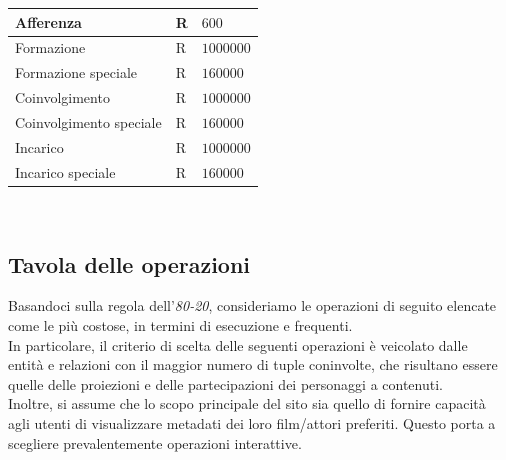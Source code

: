 \documentclass[a4paper]{article}
\begin{document}
\begin{tabular}{ | L{0.33\textwidth} | L{0.33\textwidth} | L{0.33\textwidth} | }
\hline
 Afferenza & R & $600$ \\ 

 \hline
 Formazione & R & $1000000$ \\ 

\hline
Formazione speciale & R & $160000$ \\ 

\hline
 Coinvolgimento & R & $1000000$ \\ 

\hline
Coinvolgimento speciale & R & $160000$ \\ 

\hline
 Incarico & R & $1000000$ \\ 

\hline
Incarico speciale & R & $160000$ \\ 

\hline
\end{tabular}
\\

\subsection{Tavola delle operazioni}
Basandoci sulla regola dell'\emph{80-20}, consideriamo le operazioni di seguito 
elencate come le più costose, in termini di esecuzione e frequenti. \\
In particolare, il criterio di scelta delle seguenti operazioni è veicolato dalle \\
entità e relazioni con il maggior numero di tuple coninvolte, che 
risultano essere quelle delle proiezioni e delle partecipazioni dei personaggi a contenuti. \\
Inoltre, si assume che lo scopo principale del sito sia quello di fornire capacità agli utenti
di visualizzare metadati dei loro film/attori preferiti. Questo porta a scegliere prevalentemente
operazioni interattive. \\

\hfill \break
\end{document}
